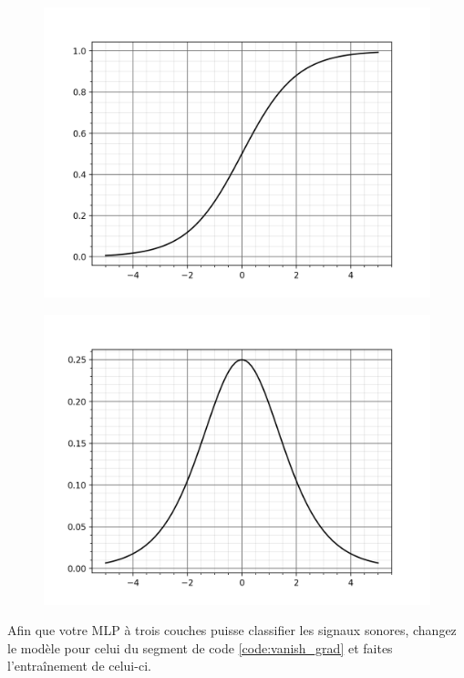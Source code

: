 \documentclass{article}
\begin{document}
\begin{figure}[H]
\centering
\begin{minipage}{.5\textwidth}
  \centering
  \includegraphics[width=1\linewidth]{Figures/sigmoid.png}
  \label{fig:sigmoid}
\end{minipage}%
\begin{minipage}{.5\textwidth}
  \centering
  \includegraphics[width=1\linewidth]{Figures/sigmoid_derivate.png}
  \label{fig:dsigmoid}
\end{minipage}
\end{figure}

Afin que votre MLP à trois couches puisse classifier les signaux sonores, changez le modèle pour celui du segment de code \ref{code:vanish_grad} et faites l'entraînement de celui-ci.
\medbreak
\end{document}
